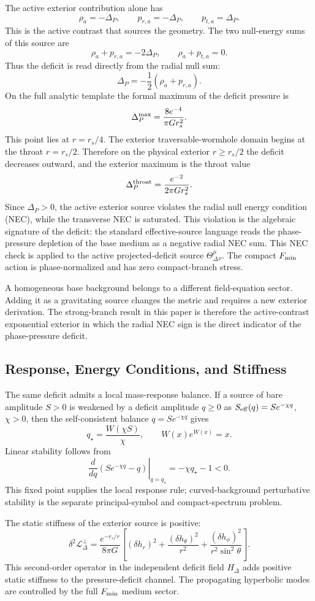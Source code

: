 \documentclass[12pt,a4paper]{article}
\begin{document}
The active exterior contribution alone has
\[
\rho_a=-\Delta_P,\qquad
p_{r,a}=-\Delta_P,\qquad
p_{t,a}=\Delta_P.
\]
This is the active contrast that sources the geometry. The two null-energy
sums of this source are
\[
\rho_a+p_{r,a}=-2\Delta_P,\qquad
\rho_a+p_{t,a}=0.
\]
Thus the deficit is read directly from the radial null sum:
\[
\Delta_P=-\frac{1}{2}\left(\rho_a+p_{r,a}\right).
\]
On the full analytic template the formal maximum of the deficit pressure is
\[
\Delta_P^{\rm max}=\frac{8e^{-4}}{\pi G r_s^2}.
\]
This point lies at $r=r_s/4$. The exterior traversable-wormhole domain begins
at the throat $r=r_s/2$. Therefore on the physical exterior $r\ge r_s/2$ the
deficit decreases outward, and the exterior maximum is the throat value
\[
\Delta_P^{\rm throat}=\frac{e^{-2}}{2\pi G r_s^2}.
\]
Since $\Delta_P>0$, the active exterior source violates the radial null energy condition (NEC), while
the transverse NEC is saturated. This violation is the algebraic signature of
the deficit: the standard effective-source language reads the phase-pressure
depletion of the base medium as a negative radial NEC sum.
This NEC check is applied to the active projected-deficit source
$\Theta_\Delta^\mu{}_\nu$. The compact $F_{\rm min}$ action is
phase-normalized and has zero compact-branch stress.

A homogeneous base background belongs to a different field-equation sector.
Adding it as a gravitating source changes the metric and requires a new
exterior derivation. The strong-branch result in this paper is therefore the
active-contrast exponential exterior in which the radial NEC sign is the direct
indicator of the phase-pressure deficit.

\subsection{Response, Energy Conditions, and Stiffness}

The same deficit admits a local mass-response balance. If a source of bare
amplitude $S>0$ is weakened by a deficit amplitude $q\ge0$ as
$S_{\rm eff}(q)=S e^{-\chi q}$, $\chi>0$, then the self-consistent balance
$q=S e^{-\chi q}$ gives
\[
q_\star=\frac{W(\chi S)}{\chi},\qquad W(x)e^{W(x)}=x.
\]
Linear stability follows from
\[
\left.\frac{d}{dq}\left(S e^{-\chi q}-q\right)\right|_{q=q_\star}
=-\chi q_\star-1<0.
\]
This fixed point supplies the local response rule; curved-background
perturbative stability is the separate principal-symbol and compact-spectrum
problem.

The static stiffness of the exterior source is positive:
\[
\delta^2\mathcal L_\Delta^\perp
=\frac{e^{-r_s/r}}{8\pi G}
\left[
(\delta h_r)^2
+\frac{(\delta h_\theta)^2}{r^2}
+\frac{(\delta h_\phi)^2}{r^2\sin^2\theta}
\right].
\]
This second-order operator in the independent deficit field $H_\Delta$ adds
positive static stiffness to the pressure-deficit channel. The propagating
hyperbolic modes are controlled by the full $F_{\rm min}$ medium sector.
\end{document}

